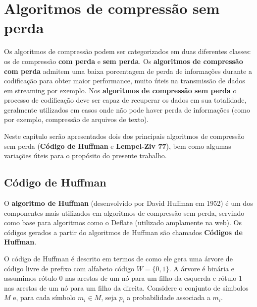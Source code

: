 \chapter{Algoritmos de compressão sem perda}\label{cap:comp}

Os algoritmos de compressão podem ser categorizados em duas diferentes classes: os de compressão \textbf{com perda} e \textbf{sem perda}. 
Os \textbf{algoritmos de compressão com perda} admitem uma baixa porcentagem de perda de informações durante a codificação para obter maior performance, muito úteis na transmissão de dados em streaming por exemplo. 
Nos \textbf{algoritmos de compressão sem perda} o processo de codificação deve ser capaz de recuperar os dados em sua totalidade, geralmente utilizados em casos onde não pode haver perda de informações (como por exemplo, compressão de arquivos de texto).

Neste capítulo serão apresentados dois dos principais algoritmos de compressão sem perda (\textbf{Código de Huffman} e \textbf{Lempel-Ziv 77}), bem como algumas variações úteis para o propósito do presente trabalho.

\pagebreak

\section{Código de Huffman} \label{sec:huff}
O \textbf{algoritmo de Huffman} (desenvolvido por David Huffman em 1952) é um dos componentes mais utilizados em algoritmos de compressão sem perda, servindo como base para algoritmos como o Deflate (utilizado amplamente na web).
Os códigos gerados a partir do algoritmos de Huffman são chamados \textbf{Códigos de Huffman}.

O código de Huffman é descrito em termos de como ele gera uma árvore
de código livre de prefixo com alfabeto código $W = \{0,1\}$. A árvore
é binária e assumimos rótulo $0$ nas arestas de um nó para um filho da
esquerda e rótulo $1$ nas arestas de um nó para um filho da direita.
Considere o conjunto de símbolos $M$ e, para cada símbolo $m_i\in M$,
seja $p_i$ a probabilidade associada a $m_i$.


